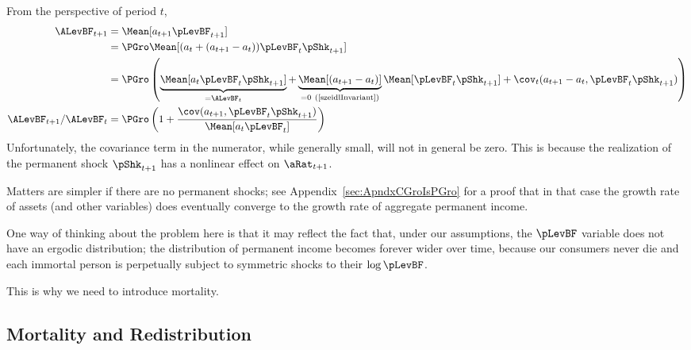 \documentclass[BufferStockTheory]{subfiles}
\begin{document}
From the perspective of period $t$, %
\begin{align*}
  \ALevBF_{t+1} & = \Mean[a_{t+1} \pLevBF_{t+1}]
  \\              & = \PGro \Mean[(a_{t}+(a_{t+1}-a_{t}))\pLevBF_{t}\pShk_{t+1}]
  \\              & = \PGro \left(\underbrace{\Mean[a_{t}\pLevBF_{t}\pShk_{t+1}]}_{=\ALevBF_{t}}+\underbrace{\Mean[(a_{t+1}-a_{t})]}_{=0~(\text{\cite{szeidlInvariant})}}\Mean[\pLevBF_{t}\pShk_{t+1}]+\cov_{t}(a_{t+1}-a_{t},\pLevBF_{t}\pShk_{t+1})\right)
  \\ \ALevBF_{t+1}/\ALevBF_{t}                    & = \PGro \left(1+\frac{\cov(a_{t+1},\pLevBF_{t}\pShk_{t+1})}{\Mean[a_{t}\pLevBF_{t}]}\right)
\end{align*}
Unfortunately, the covariance term in the numerator, while generally small, will not in general be zero.  This is because the realization of the permanent shock $\pShk_{t+1}$ has a nonlinear effect on $\aRat_{t+1}$.
\begin{comment}
\begin{align}
  \aFunc(\mRat_{t+1}) & \approx \aFunc(\mRat_{t})+\aFunc^{\prime}(\mRat_{t})(m_{t+1}-\mRat_{t})
\\ \cov_{t}(a_{t+1}-a_{t},\pLevBF_{t}\pShk_{t+1}) & \approx \cov_{t}\left( \aFunc^{\prime}(\mRat_{t})(m_{t+1}-\mRat_{t}),\pShk_{t+1} \pLevBF_{t})
\end{align}
\end{comment}
Matters are simpler if there are no permanent shocks; see Appendix~\ref{sec:ApndxCGroIsPGro} for a proof that in that case the growth rate of assets (and other variables) does eventually converge to the growth rate of aggregate permanent income.

One way of thinking about the problem here is that it may reflect the fact that, under our assumptions, the $\pLevBF$ variable does not have an ergodic distribution; the distribution of permanent income becomes forever wider over time, because our consumers never die and each immortal person is perpetually subject to symmetric shocks to their $\log \pLevBF$.

This is why we need to introduce mortality.


\hypertarget{Mortality-And-Redistribution}{}
\subsection{Mortality and Redistribution}\label{sec:Mortality-And-Redistribution}
\end{document}
